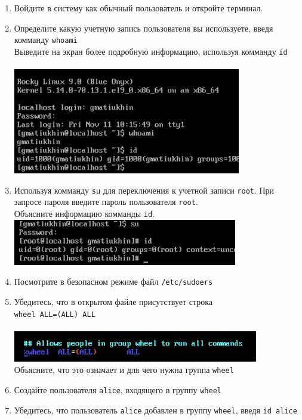 \documentclass[12pt]{article}
\begin{document}
      \begin{enumerate}
        \item Войдите в систему как обычный пользователь и откройте терминал.
        \item Определите какую учетную запись пользователя вы используете, введя комманду \texttt{whoami}\\
          Выведите на экран более подробную информацию, используя комманду \texttt{id}\\
          \\\includegraphics{1.png}\\
        \item Используя комманду \texttt{su} для переключения к учетной записи \verb!root!. При запросе пароля введите пароль пользователя \verb!root!.\\Объясните информацию комманды \verb!id!.
          \\\includegraphics{2.png}\\
        \item Посмотрите в безопасном режиме файл \texttt{/etc/sudoers}
        \item Убедитесь, что в открытом файле присутствует строка\\ \texttt{wheel ALL=(ALL) ALL}\\
          \\\includegraphics{3.png}\\
          Объясните, что это означает и для чего нужна группа \texttt{wheel}
        \item Создайте пользователя \texttt{alice}, входящего в группу \verb!wheel!
        \item Убедитесь, что пользователь \texttt{alice} добавлен в группу \verb!wheel!, введя \verb!id alice!

\end{enumerate}
\end{document}
